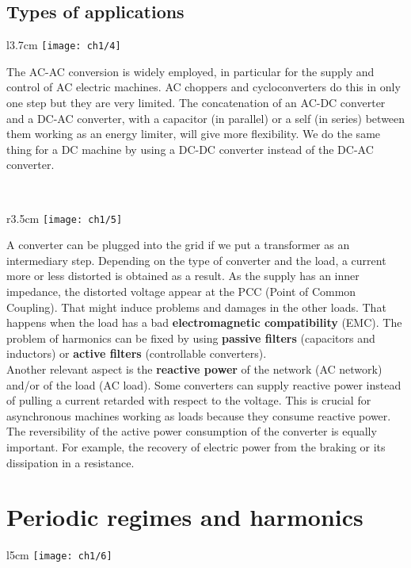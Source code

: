 	\subsection{Types of applications}
		\begin{wrapfigure}[9]{l}{3.7cm}
		\vspace{-5mm}
		\texttt{[image: ch1/4]}
		\end{wrapfigure}	
		The AC-AC conversion is widely employed, in particular for the supply and control of AC electric machines. AC choppers and cycloconverters do this in only one step but they are very limited. The concatenation of an AC-DC converter and a DC-AC converter, with a capacitor (in parallel) or a self (in series) between them working as an energy limiter, will give more flexibility. We do the same thing for a DC machine by using a DC-DC converter instead of the DC-AC converter.
		
		\ \\
		\begin{wrapfigure}[8]{r}{3.5cm}
		\vspace{0mm}
		\texttt{[image: ch1/5]}
		\end{wrapfigure}
		
		A converter can be plugged into the grid if we put a transformer as an intermediary step. Depending on the type of converter and the load, a current more or less distorted is obtained as a result. As the supply has an inner impedance, the distorted voltage appear at the PCC (Point of Common Coupling). That might induce problems and damages in the other loads. That happens when the load has a bad \textbf{electromagnetic compatibility} (EMC). The problem of harmonics can be fixed by using \textbf{passive filters} (capacitors and inductors) or \textbf{active filters} (controllable converters).\\
		
		Another relevant aspect is the \textbf{reactive power} of the network (AC network) and/or of the load (AC load). Some converters can supply reactive power instead of pulling a current retarded with respect to the voltage. This is crucial for asynchronous machines working as loads because they consume reactive power. The reversibility of the active power consumption of the converter is equally important. For example, the recovery of electric power from the braking or its dissipation in a resistance. 
		

\section{Periodic regimes and harmonics}
	\begin{wrapfigure}[6]{l}{5cm}
	\vspace{-5mm}
	\texttt{[image: ch1/6]}
	\end{wrapfigure}
	
